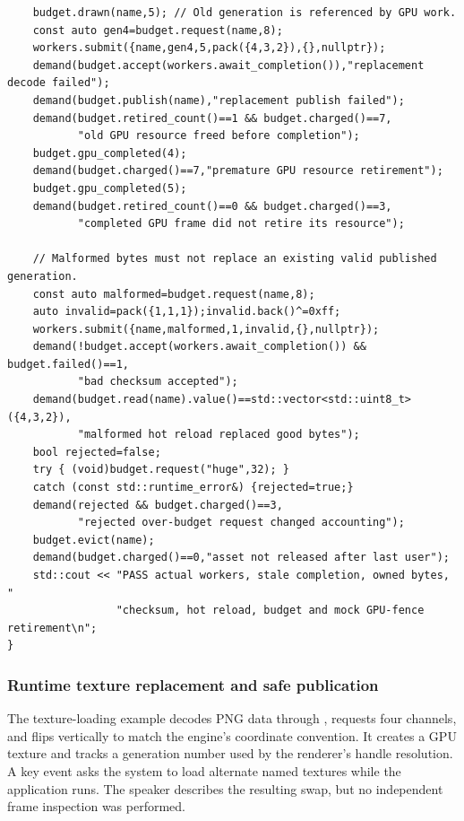 \begin{verbatim}
    budget.drawn(name,5); // Old generation is referenced by GPU work.
    const auto gen4=budget.request(name,8);
    workers.submit({name,gen4,5,pack({4,3,2}),{},nullptr});
    demand(budget.accept(workers.await_completion()),"replacement decode failed");
    demand(budget.publish(name),"replacement publish failed");
    demand(budget.retired_count()==1 && budget.charged()==7,
           "old GPU resource freed before completion");
    budget.gpu_completed(4);
    demand(budget.charged()==7,"premature GPU resource retirement");
    budget.gpu_completed(5);
    demand(budget.retired_count()==0 && budget.charged()==3,
           "completed GPU frame did not retire its resource");

    // Malformed bytes must not replace an existing valid published generation.
    const auto malformed=budget.request(name,8);
    auto invalid=pack({1,1,1});invalid.back()^=0xff;
    workers.submit({name,malformed,1,invalid,{},nullptr});
    demand(!budget.accept(workers.await_completion()) && budget.failed()==1,
           "bad checksum accepted");
    demand(budget.read(name).value()==std::vector<std::uint8_t>({4,3,2}),
           "malformed hot reload replaced good bytes");
    bool rejected=false;
    try { (void)budget.request("huge",32); }
    catch (const std::runtime_error&) {rejected=true;}
    demand(rejected && budget.charged()==3,
           "rejected over-budget request changed accounting");
    budget.evict(name);
    demand(budget.charged()==0,"asset not released after last user");
    std::cout << "PASS actual workers, stale completion, owned bytes, "
                 "checksum, hot reload, budget and mock GPU-fence retirement\n";
}
\end{verbatim}

\subsubsection{Runtime texture replacement and safe publication}\label{06-engine-ii-ch027-runtime-texture-replacement-and-safe-publication}

\hypertarget{06-engine-ii-ch027-runtime-texture-replacement-and-safe-publication}{}

The texture-loading example decodes PNG data through , requests four channels, and flips vertically to match the engine's coordinate convention. It creates a GPU texture and tracks a generation number used by the renderer's handle resolution. A key event asks the system to load alternate named textures while the application runs. The speaker describes the resulting swap, but no independent frame inspection was performed.

